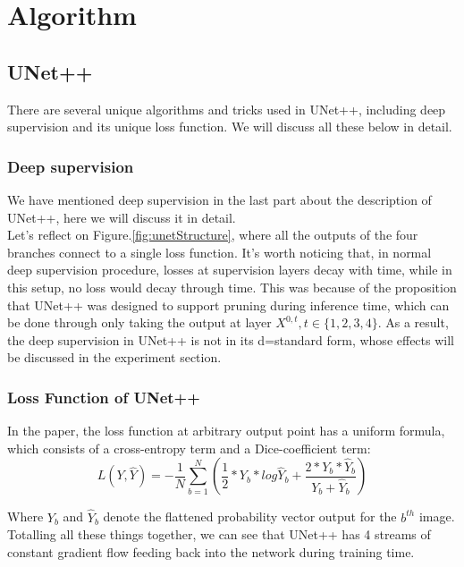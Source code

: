 \section{Algorithm}
\subsection{UNet++}
There are several unique algorithms and tricks used in UNet++, including deep supervision and its unique loss function. We will discuss all these below in detail.
\subsubsection{Deep supervision}
We have mentioned deep supervision in the last part about the description of UNet++, here we will discuss it in detail.\\
Let's reflect on Figure.\ref{fig:unetStructure}, where all the outputs of the four branches connect to a single loss function. It's worth noticing that, in normal deep supervision procedure, losses at supervision layers decay with time, while in this setup, no loss would decay through time. This was because of the proposition that UNet++ was designed to support pruning during inference time, which can be done through only taking the output at layer $X^{0,t}, t\in \{1,2,3,4\}$. As a result, the deep supervision in UNet++ is not in its d=standard form, whose effects will be discussed in the experiment section.\\
\subsubsection{Loss Function of UNet++}
In the paper\cite{unet_pp}, the loss function at arbitrary output point has a uniform formula, which consists of a cross-entropy term and a Dice-coefficient term:
\begin{equation}
    \displaystyle L(Y, \hat Y)=-\frac{1}{N}\sum_{b=1}^{N}(\frac12 * Y_b * log\hat Y_b + \frac{2* Y_b*\hat Y_b}{Y_b + \hat Y_b})
\end{equation}

Where $Y_b$ and $\hat Y_b$ denote the flattened probability vector output for the $b^{th}$ image.\\

Totalling all these things together, we can see that UNet++ has 4 streams of constant gradient flow feeding back into the network during training time.